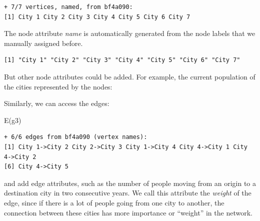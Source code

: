 \documentclass[
  letterpaper,
  DIV=11,
  numbers=noendperiod]{scrreprt}
\newenvironment{Shaded}{\begin{snugshade}}{\end{snugshade}}
\newcommand{\DecValTok}[1]{\textcolor[rgb]{0.68,0.00,0.00}{#1}}
\newcommand{\FunctionTok}[1]{\textcolor[rgb]{0.28,0.35,0.67}{#1}}
\newcommand{\NormalTok}[1]{\textcolor[rgb]{0.00,0.23,0.31}{#1}}
\newcommand{\OtherTok}[1]{\textcolor[rgb]{0.00,0.23,0.31}{#1}}
\newcommand{\SpecialCharTok}[1]{\textcolor[rgb]{0.37,0.37,0.37}{#1}}
\begin{document}
\begin{verbatim}
+ 7/7 vertices, named, from bf4a090:
[1] City 1 City 2 City 3 City 4 City 5 City 6 City 7
\end{verbatim}

The node attribute \emph{name} is automatically generated from the node
labels that we manually assigned before.

\begin{Shaded}
\end{Shaded}

\begin{verbatim}
[1] "City 1" "City 2" "City 3" "City 4" "City 5" "City 6" "City 7"
\end{verbatim}

But other node attributes could be added. For example, the current
population of the cities represented by the nodes:

\begin{Shaded}
\end{Shaded}

Similarly, we can access the edges:

\begin{Shaded}
\begin{Highlighting}[]
\FunctionTok{E}\NormalTok{(g3)}
\end{Highlighting}
\end{Shaded}

\begin{verbatim}
+ 6/6 edges from bf4a090 (vertex names):
[1] City 1->City 2 City 2->City 3 City 1->City 4 City 4->City 1 City 4->City 2
[6] City 4->City 5
\end{verbatim}

and add edge attributes, such as the number of people moving from an
origin to a destination city in two consecutive years. We call this
attribute the \emph{weight} of the edge, since if there is a lot of
people going from one city to another, the connection between these
cities has more importance or ``weight'' in the network.
\end{document}
